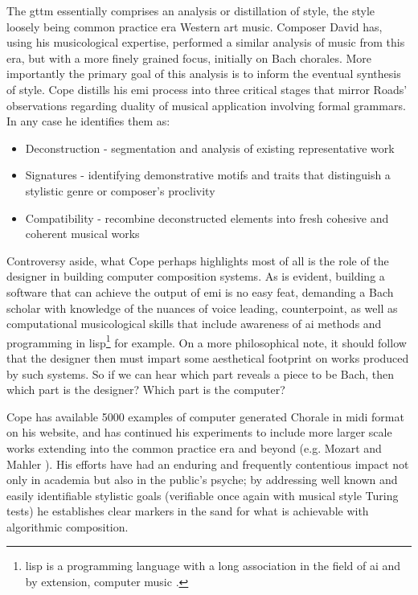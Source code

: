 The \acrshort{gttm} essentially comprises an analysis or distillation of style, the style loosely being common practice era Western art music. Composer David \cite{Cope1991} has, using his musicological expertise, performed a similar analysis of music from this era, but with a more finely grained focus, initially on Bach chorales. More importantly the primary goal of this analysis is to inform the eventual synthesis of style. Cope distills his \acrfull{emi} \citep{Cope1987} process into three critical stages that mirror Roads’ observations regarding duality of musical application involving formal grammars. In any case he identifies them as:

\begin{itemize}
	\item Deconstruction - segmentation and analysis of existing representative work
	\item Signatures - identifying demonstrative motifs and traits that distinguish a stylistic genre or composer’s proclivity
	\item Compatibility - recombine deconstructed elements into fresh cohesive and coherent musical works
\end{itemize}

Controversy aside, what Cope perhaps highlights most of all is the role of the designer in building computer composition systems. As is evident, building a software that can achieve the output of \acrfull{emi} is no easy feat, demanding a Bach scholar with knowledge of the nuances of voice leading, counterpoint, as well as computational musicological skills that include awareness of \acrshort{ai} methods and programming in \acrshort{lisp}\footnote{\acrfull{lisp} is a programming language with a long association in the field of \acrshort{ai} and by extension, computer music \citep{taube1991common, taube2004notes, assayag2006computer}.} for example. On a more philosophical note, it should follow that the designer then must impart some aesthetical footprint on works produced by such systems. So if we can hear which part reveals a piece to be Bach, then which part is the designer? Which part is the computer? 

Cope has available 5000 examples of computer generated Chorale in \acrshort{midi} format on his website, and has continued his experiments to include more larger scale works extending into the common practice era and beyond (e.g. Mozart and Mahler \citep{Muscutt2007, cope2009hidden}). His efforts have had an enduring and frequently contentious impact not only in academia \citep{Wiggins2008} but also in the public’s psyche; by addressing well known and easily identifiable stylistic goals (verifiable once again with musical style Turing tests)   he establishes clear markers in the sand for what is achievable with algorithmic composition. 

